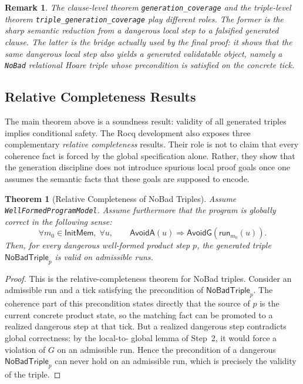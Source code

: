 \documentclass[11pt,a4paper]{article}
\newtheorem{theorem}[definition]{Theorem}
\newtheorem{remark}[definition]{Remark}
\newcommand{\AvoidA}{\mathsf{AvoidA}}
\newcommand{\AvoidG}{\mathsf{AvoidG}}
\newcommand{\run}{\mathsf{run}}
\begin{document}
\begin{remark}
The clause-level theorem \texttt{generation\_coverage} and the triple-level
theorem \texttt{triple\_generation\_coverage} play different roles. The former
is the sharp semantic reduction from a dangerous local step to a falsified
generated clause. The latter is the bridge actually used by the final proof: it
shows that the same dangerous local step also yields a generated validatable
object, namely a \texttt{NoBad} relational Hoare triple whose precondition is
satisfied on the concrete tick.
\end{remark}

\subsection{Relative Completeness Results}

The main theorem above is a soundness result: validity of all generated triples
implies conditional safety. The Rocq development also exposes three
complementary \emph{relative completeness} results. Their role is not to claim
that every coherence fact is forced by the global specification alone. Rather,
they show that the generation discipline does not introduce spurious local
proof goals once one assumes the semantic facts that these goals are supposed
to encode.

\begin{theorem}[Relative Completeness of NoBad Triples]
Assume \texttt{WellFormedProgramModel}. Assume furthermore that the program is
globally correct in the following sense:
\[
\forall m_0 \in \mathsf{InitMem},\;\forall u,\qquad
\AvoidA(u) \Rightarrow \AvoidG(\run_{m_0}(u)).
\]
Then, for every dangerous well-formed product step \(p\), the generated triple
\(\mathsf{NoBadTriple}_p\) is valid on admissible runs.
\end{theorem}

\begin{proof}
This is the relative-completeness theorem for NoBad triples. Consider an
admissible run and a tick satisfying the precondition of
\(\mathsf{NoBadTriple}_p\). The coherence part of this precondition states
directly that the source of \(p\) is the current concrete product state, so
the matching fact can be promoted to a realized dangerous step at that tick.
But a realized dangerous step contradicts global correctness: by the local-to-
global lemma of Step~2, it would force a violation of \(G\) on an admissible
run. Hence the precondition of a dangerous \(\mathsf{NoBadTriple}_p\) can never
hold on an admissible run, which is precisely the validity of the triple.
\end{proof}
\end{document}

